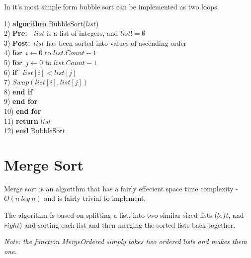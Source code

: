 \documentclass[10pt,oneside,a4paper]{report}
\begin{document}
In it's most simple form bubble sort can be implemented as two loops.

\begin{tabbing}
1)  \textbf{alg}\= \textbf{orithm} BubbleSort($list$) \\
2)  \> \textbf{Pre:}~~$list$ is a list of integers, and $list != \emptyset$ \\
3)  \> \textbf{Post:}~$list$ has been sorted into values of ascending order \\
4)  \> \textbf{for}\=~$i \leftarrow 0$ to $list.Count - 1$ \\
5)  \> \> \textbf{for}\=~$j \leftarrow 0$ to $list.Count - 1$ \\
6)  \> \> \> \textbf{if}~\= $list[i] < list[j]$ \\
7)  \> \> \> \> $Swap(list[i], list[j])$ \\
8)  \> \> \> \textbf{end if} \\
9)  \> \> \textbf{end for} \\
10) \> \textbf{end for} \\
11) \> \textbf{return} $list$ \\
12) \textbf{end} BubbleSort
\end{tabbing}

\section{Merge Sort}
Merge sort is an algorithm that has a fairly effecient space time complexity - $O(n~log~n)$ and is fairly trivial to implement.

The algorithm is based on splitting a list, into two similar sized lists ($left$, and $right$) and sorting each list and then merging the sorted lists back together.

\textit{Note: the function MergeOrdered simply takes two ordered lists and makes them one.}
\end{document}
